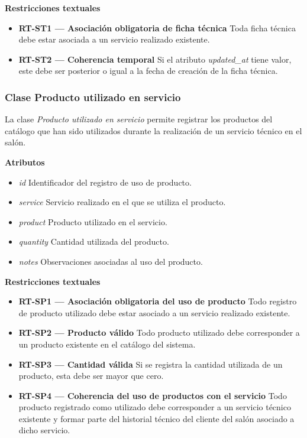 \textbf{Restricciones textuales}

\begin{itemize}

      \item \textbf{RT-ST1 — Asociación obligatoria de ficha técnica}
            Toda ficha técnica debe estar asociada a un servicio realizado existente.
      \item \textbf{RT-ST2 — Coherencia temporal}
            Si el atributo \textit{updated\_at} tiene valor, este debe ser posterior o igual a la fecha de creación de la ficha técnica.

\end{itemize}

\subsubsection{Clase Producto utilizado en servicio}

La clase \textit{Producto utilizado en servicio} permite registrar los productos del catálogo que han sido utilizados durante la realización de un servicio técnico en el salón.

\textbf{Atributos}

\begin{itemize}

      \item \textit{id}
            Identificador del registro de uso de producto.
      \item \textit{service}
            Servicio realizado en el que se utiliza el producto.
      \item \textit{product}
            Producto utilizado en el servicio.
      \item \textit{quantity}
            Cantidad utilizada del producto.
      \item \textit{notes}
            Observaciones asociadas al uso del producto.

\end{itemize}

\textbf{Restricciones textuales}

\begin{itemize}

      \item \textbf{RT-SP1 — Asociación obligatoria del uso de producto}
            Todo registro de producto utilizado debe estar asociado a un servicio realizado existente.
      \item \textbf{RT-SP2 — Producto válido}
            Todo producto utilizado debe corresponder a un producto existente en el catálogo del sistema.
      \item \textbf{RT-SP3 — Cantidad válida}
            Si se registra la cantidad utilizada de un producto, esta debe ser mayor que cero.
      \item \textbf{RT-SP4 — Coherencia del uso de productos con el servicio}
            Todo producto registrado como utilizado debe corresponder a un servicio técnico existente y formar parte del historial técnico del cliente del salón asociado a dicho servicio.
\end{itemize}

